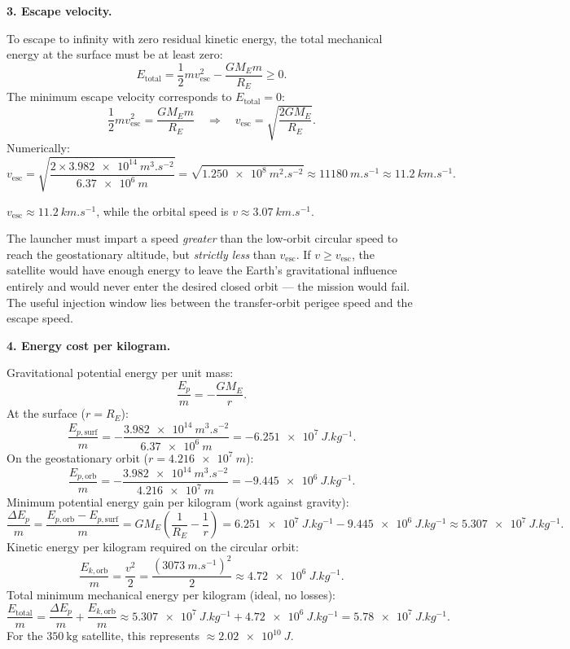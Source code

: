 \documentclass[11pt]{article}
\begin{document}
\begin{exoresolu}
\textbf{3. Escape velocity.}\par
To escape to infinity with zero residual kinetic energy, the total mechanical energy at the surface must be at least zero:
\[
E_{\mathrm{total}} = \frac{1}{2}mv_{\mathrm{esc}}^{2} - \frac{GM_{E}m}{R_{E}} \ge 0.
\]
The minimum escape velocity corresponds to $E_{\mathrm{total}} = 0$:
\[
\frac{1}{2}mv_{\mathrm{esc}}^{2} = \frac{GM_{E}m}{R_{E}}
\quad\Longrightarrow\quad
v_{\mathrm{esc}} = \sqrt{\frac{2GM_{E}}{R_{E}}}.
\]
Numerically:
\[
v_{\mathrm{esc}} = \sqrt{\frac{2 \times \SI{3.982e14}{m^{3}.s^{-2}}}{\SI{6.37e6}{m}}}
= \sqrt{\SI{1.250e8}{m^{2}.s^{-2}}}
\approx \SI{11180}{m.s^{-1}} \approx \SI{11.2}{km.s^{-1}}.
\]

\begin{aretenir}[Result 3]
$v_{\mathrm{esc}} \approx \SI{11.2}{km.s^{-1}}$, while the orbital speed is $v \approx \SI{3.07}{km.s^{-1}}$.
\end{aretenir}

The launcher must impart a speed \emph{greater} than the low-orbit circular speed to reach the geostationary altitude, but \emph{strictly less} than $v_{\mathrm{esc}}$. If $v \ge v_{\mathrm{esc}}$, the satellite would have enough energy to leave the Earth's gravitational influence entirely and would never enter the desired closed orbit — the mission would fail. The useful injection window lies between the transfer-orbit perigee speed and the escape speed.

\textbf{4. Energy cost per kilogram.}\par
Gravitational potential energy per unit mass:
\[
\frac{E_{p}}{m} = -\frac{GM_{E}}{r}.
\]
At the surface ($r = R_E$):
\[
\frac{E_{p,\mathrm{surf}}}{m} = -\frac{\SI{3.982e14}{m^{3}.s^{-2}}}{\SI{6.37e6}{m}}
= -\SI{6.251e7}{J.kg^{-1}}.
\]
On the geostationary orbit ($r = \SI{4.216e7}{m}$):
\[
\frac{E_{p,\mathrm{orb}}}{m} = -\frac{\SI{3.982e14}{m^{3}.s^{-2}}}{\SI{4.216e7}{m}}
= -\SI{9.445e6}{J.kg^{-1}}.
\]
Minimum potential energy gain per kilogram (work against gravity):
\[
\frac{\Delta E_{p}}{m} = \frac{E_{p,\mathrm{orb}} - E_{p,\mathrm{surf}}}{m}
= GM_{E}\left(\frac{1}{R_{E}} - \frac{1}{r}\right)
= \SI{6.251e7}{J.kg^{-1}} - \SI{9.445e6}{J.kg^{-1}}
\approx \SI{5.307e7}{J.kg^{-1}}.
\]
Kinetic energy per kilogram required on the circular orbit:
\[
\frac{E_{k,\mathrm{orb}}}{m} = \frac{v^{2}}{2} = \frac{(\SI{3073}{m.s^{-1}})^{2}}{2}
\approx \SI{4.72e6}{J.kg^{-1}}.
\]
Total minimum mechanical energy per kilogram (ideal, no losses):
\[
\frac{E_{\mathrm{total}}}{m} = \frac{\Delta E_{p}}{m} + \frac{E_{k,\mathrm{orb}}}{m}
\approx \SI{5.307e7}{J.kg^{-1}} + \SI{4.72e6}{J.kg^{-1}}
= \SI{5.78e7}{J.kg^{-1}}.
\]
For the $350\ \mathrm{kg}$ satellite, this represents $\approx \SI{2.02e10}{J}$.


\end{exoresolu}
\end{document}
